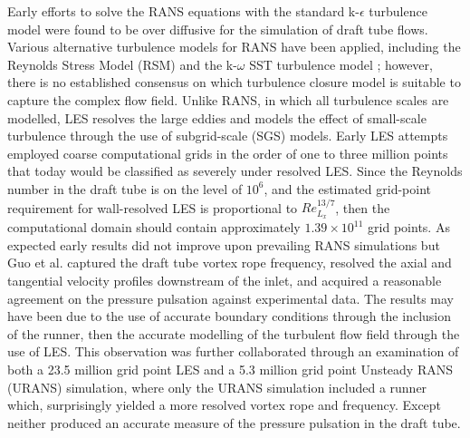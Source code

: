 Early efforts to solve the RANS equations with the standard k-$\epsilon$ turbulence model \cite{sick2002cfd, ruprecht2002simulation} were found to be over diffusive for the simulation of draft tube flows. 
Various alternative turbulence models for RANS have been applied, including the Reynolds Stress Model (RSM) \cite{sick2002cfd, stein2006numerical, jovst2009numerical, jovst2011numerical} and the k-$\omega$ SST turbulence model \cite{foroutan2012simulation, foroutan2014flow, krappel2014investigation}; however, there is no established consensus on which turbulence closure model is suitable to capture the complex flow field. Unlike RANS, in which all turbulence scales are modelled, LES resolves the large eddies and models the effect of small-scale turbulence through the use of subgrid-scale (SGS) models. Early LES attempts \cite{chen1995multi,skotak2000helical,guo2006large} employed coarse computational grids in the order of one to three million points that today would be classified as severely under resolved LES. Since the Reynolds number in the draft tube is on the level of $10^{6}$, and the estimated grid-point requirement for wall-resolved LES is proportional to $Re_{L_{x}}^{13/7}$, then the computational domain should contain approximately $1.39\times 10^{11}$ grid points. As expected early results \cite{chen1995multi,skotak2000helical} did not improve upon prevailing RANS simulations but Guo et al. \cite{guo2006large} captured the draft tube vortex rope frequency, resolved the axial and tangential velocity profiles downstream of the inlet, and acquired a reasonable agreement on the pressure pulsation against experimental data. The results may have been due to the use of accurate boundary conditions through the inclusion of the runner, then the accurate modelling of the turbulent flow field through the use of LES. This observation was further collaborated through an examination \cite{jovst2011numerical} of both a 23.5 million grid point LES and a 5.3 million grid point Unsteady RANS (URANS) simulation, where only the URANS simulation included a runner which, surprisingly yielded a more resolved vortex rope and frequency. Except neither produced an accurate measure of the pressure pulsation in the draft tube. %
